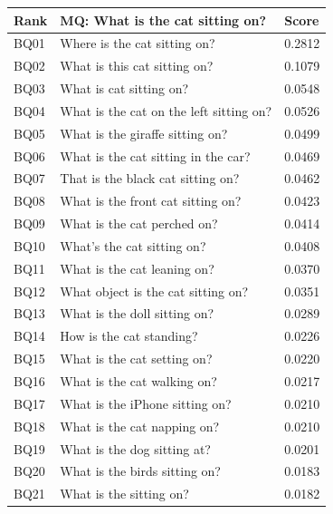 \documentclass[letterpaper]{article}
\begin{document}
\begin{table}
\begin{subtable}{0.49\linewidth}
	\end{subtable}
	\begin{subtable}{0.49\linewidth}
		\begin{adjustbox}{width=0.46\columnwidth}
\begin{tabular}{l|l|l}
			Rank & MQ: What is the cat sitting on?         & Score  \\
			\hline
			BQ01 & Where is the cat sitting on?            & 0.2812 \\
			BQ02 & What is this cat sitting on?            & 0.1079 \\
			BQ03 & What is cat sitting on?                 & 0.0548 \\
			BQ04 & What is the cat on the left sitting on? & 0.0526 \\
			BQ05 & What is the giraffe sitting on?         & 0.0499 \\
			BQ06 & What is the cat sitting in the car?     & 0.0469 \\
			BQ07 & That is the black cat sitting on?       & 0.0462 \\
			BQ08 & What is the front cat sitting on?       & 0.0423 \\
			BQ09 & What is the cat perched on?             & 0.0414 \\
			BQ10 & What's the cat sitting on?              & 0.0408 \\
			BQ11 & What is the cat leaning on?             & 0.0370 \\
			BQ12 & What object is the cat sitting on?      & 0.0351 \\
			BQ13 & What is the doll sitting on?            & 0.0289 \\
			BQ14 & How is the cat standing?                & 0.0226 \\
			BQ15 & What is the cat setting on?             & 0.0220 \\
			BQ16 & What is the cat walking on?             & 0.0217 \\
			BQ17 & What is the iPhone sitting on?          & 0.0210 \\
			BQ18 & What is the cat napping on?             & 0.0210 \\
			BQ19 & What is the dog sitting at?             & 0.0201 \\
			BQ20 & What is the birds sitting on?           & 0.0183 \\
			BQ21 & What is the sitting on?                 & 0.0182 \\
		\end{tabular}
\end{adjustbox}

\end{subtable}
\end{table}
\end{document}
